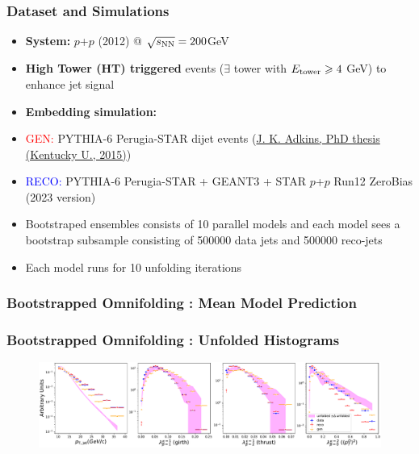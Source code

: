 \documentclass[10pt, aspectratio = 169]{beamer}
\begin{document}
	\begin{frame}
		\frametitle{Dataset and Simulations}
		\begin{itemize}
			\item<1-> \textbf{System:} $p$+$p$ (2012) @ $\sqrt{s_{\rm NN}} = 200$GeV 
			\item<2-> \textbf{High Tower (HT) triggered }events ($\exists$ tower with $E_{\rm tower} \geqslant 4$ GeV) to enhance jet signal
			\item<3-> \textbf{Embedding simulation: } 	
			\item<4-> \textcolor{red}{GEN: }PYTHIA-6 Perugia-STAR dijet events (\href{https://drupal.star.bnl.gov/STAR/theses/phd-79}{J. K. Adkins, PhD thesis (Kentucky U., 2015)})%
			\item<4-> \textcolor{blue}{RECO: }PYTHIA-6 Perugia-STAR + GEANT3 +  STAR $p$+$p$ Run12 ZeroBias (2023 version)
				\item<5->  Bootstraped ensembles consists of 10 parallel models and each model sees a bootstrap subsample consisting of 500000 data jets and 500000 reco-jets
			\item<6-> Each model runs for 10 unfolding iterations
		\end{itemize}
	\end{frame}
	
	
	\begin{frame}
		\frametitle{Bootstrapped Omnifolding :  Mean Model Prediction}
	\end{frame}
	
	\begin{frame}
		\frametitle{Bootstrapped Omnifolding :  Unfolded Histograms}
		\begin{figure}
			\includegraphics[width=\linewidth]{unfolded_hist/iteration_4.pdf}
		\end{figure}
	\end{frame}
	
\end{document}
